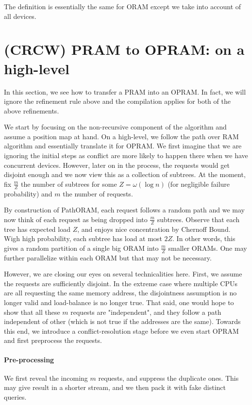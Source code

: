     \begin{remark}
    	The definition is essentially the same for ORAM except we take into account of all devices.
    \end{remark}
    
    \section{(CRCW) PRAM to OPRAM: on a high-level}
    In this section, we see how to transfer a PRAM into an OPRAM. In fact, we will ignore the refinement rule above and the compilation applies for both of the above refinements.
    
    We start by focusing on the non-recursive component of the algorithm  and assume a position map at hand. On a high-level, we follow the path over RAM algorithm and essentially translate it for OPRAM. We first imagine that we are ignoring the initial steps as conflict are more likely to happen there when we have concurrent devices. However, later on in the process, the requests would get disjoint enough and we now view this as a collection of subtrees. At the moment, fix $\frac{m}{Z}$ the number of subtrees for some $Z =\omega(\log n)$ (for negligible failure probability) and $m$ the number of requests. 
    
     By construction of PathORAM, each request follows a random path and we may now think of each request as being dropped into $\frac{m}{Z}$ subtrees. Observe that each tree has expected load $Z$, and enjoys nice concentration by Chernoff Bound. Wigh high probability, each subtree has load at most $2Z$. In other words, this gives a random partition of a single big ORAM into $\frac{m}{Z}$ smaller ORAMs. One may further parallelize within each ORAM but that may not be necessary.
     
     However, we are closing our eyes on several technicalities here. First, we assume the requests are sufficiently disjoint. In the extreme case where multiple CPUs are all requesting the same memory address, the disjointness assumption is no longer  valid and load-balance is no longer true. That said, one would hope to show that all these $m$ requests are "independent", and they follow a path independent of other (which is not true if the addresses are the same). Towards this end, we introduce a conflict-resolution stage before we even start OPRAM and first preprocess the requests.
     
     \paragraph{Pre-processing} We first reveal the incoming $m$ requests, and suppress the duplicate ones. This may give result in a shorter stream, and we then pack it with fake distinct queries.
     
